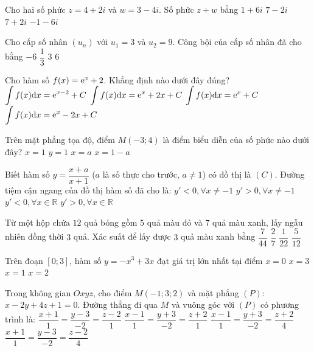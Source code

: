 \begin{ex}%
Cho hai số phức $z=4+2 i$ và $w=3-4 i$. Số phức $z+w$ bằng
\choice
{$1+6 i$}
{\True $7-2 i$}
{$7+2 i$}
{$-1-6 i$}

\end{ex}
\begin{ex}%
Cho cấp số nhân $\left(u_n\right)$ với $u_1=3$ và $u_2=9$. Công bội của cấp số nhân đã cho bằng
\choice
{$-6$}
{$\dfrac{1}{3}$}
{\True $3$}
{$6$}

\end{ex}
\begin{ex}%
Cho hàm số $f(x)={\rm e}^{x}+2$. Khẳng định nào dưới đây đúng?
\choice
{$\displaystyle\displaystyle\int f(x) \mathrm{d} x={\rm e}^{x-2}+C$}
{\True $\displaystyle\displaystyle\int f(x) \mathrm{d} x={\rm e}^{x}+2 x+C$}
{$\displaystyle\displaystyle\int f(x) \mathrm{d} x={\rm e}^{x}+C$}
{$\displaystyle\displaystyle\int f(x) \mathrm{d} x={\rm e}^{x}-2 x+C$}

\end{ex}
\begin{ex}%
Trên mặt phẳng tọa độ, điểm $M(-3; 4)$ là điểm biểu diễn của số phức nào dưới đây?
\choice
{$x=1$}
{\True $y=1$}
{$x=a$}
{$x=1-a$}

\end{ex}
\begin{ex}%
Biết hàm số $y=\dfrac{x+a}{x+1}$ ($a$ là số thực cho trước, $a \neq 1$) có đồ thị là $(C)$. Đường tiệm cận ngang của đồ thị hàm số đã cho là:
\choice
{$y'<0, \forall x \neq-1$}
{\True $y'>0, \forall x \neq-1$}
{$y'<0, \forall x \in \mathbb{R}$}
{$y'>0, \forall x \in \mathbb{R}$}

\end{ex}
\begin{ex}%
Từ một hộp chứa $12$ quả bóng gồm $5$ quả màu đỏ và $7$ quả màu xanh, lấy ngẫu nhiên đồng thời $3$ quả. Xác suất để lấy được $3$ quả màu xanh bằng
\choice
{\True $\dfrac{7}{44}$}
{$\dfrac{2}{7}$}
{$\dfrac{1}{22}$}
{$\dfrac{5}{12}$}

\end{ex}
\begin{ex}%
Trên đoạn $[0; 3]$, hàm số $y=-x^3+3 x$ đạt giá trị lớn nhất tại điểm
\choice
{$x=0$}
{$x=3$}
{\True $x=1$}
{$x=2$}

\end{ex}
\begin{ex}%
Trong không gian $O x y z$, cho điểm $M(-1; 3; 2)$ và mặt phẳng $(P)$: $x-2 y+4 z+1=0$. Đường thẳng đi qua $M$ và vuông góc với $(P)$ có phương trình là:
\choice
{$\dfrac{x+1}{1}=\dfrac{y-3}{-2}=\dfrac{z-2}{1}$}
{$\dfrac{x-1}{1}=\dfrac{y+3}{-2}=\dfrac{z+2}{1}$}
{$\dfrac{x-1}{1}=\dfrac{y+3}{-2}=\dfrac{z+2}{4}$}
{\True $\dfrac{x+1}{1}=\dfrac{y-3}{-2}=\dfrac{z-2}{4}$}

\end{ex}
